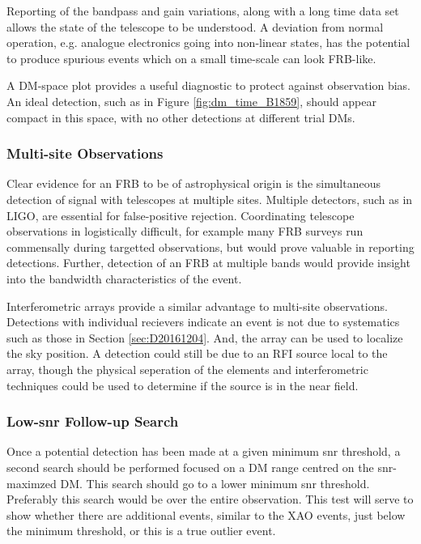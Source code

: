 \documentclass[a4paper,fleqn,usenatbib]{mnras}
\begin{document}
Reporting of the bandpass and gain variations, along with a long time data set
allows the state of the telescope to be understood. A deviation from normal
operation, e.g. analogue electronics going into non-linear states, has the
potential to produce spurious events which on a small time-scale can look
FRB-like.

A DM-space plot provides a useful diagnostic to protect against observation
bias. An ideal detection, such as in Figure \ref{fig:dm_time_B1859}, should
appear compact in this space, with no other detections at different trial DMs.

\subsubsection{Multi-site Observations}

Clear evidence for an FRB to be of astrophysical origin is the simultaneous
detection of signal with telescopes at multiple sites. Multiple detectors, such
as in LIGO, are essential for false-positive rejection. Coordinating telescope
observations in logistically difficult, for example many FRB surveys run
commensally during targetted observations, but would prove valuable in reporting
detections.  Further, detection of an FRB at multiple bands would provide
insight into the bandwidth characteristics of the event.

Interferometric arrays provide a similar advantage to multi-site observations.
Detections with individual recievers indicate an event is not due to systematics
such as those in Section \ref{sec:D20161204}. And, the array can be used to
localize the sky position. A detection could still be due to an RFI source local to
the array, though the physical seperation of the elements and interferometric
techniques could be used to determine if the source is in the near field.

\subsubsection{Low-\gls{snr} Follow-up Search}

Once a potential detection has been made at a given minimum \gls{snr} threshold,
a second search should be performed focused on a DM range centred on the
\gls{snr}-maximzed DM. This search should go to a lower minimum \gls{snr} threshold.
Preferably this search would be over the entire observation. This test will
serve to show whether there are additional events, similar to the XAO events,
just below the minimum threshold, or this is a true outlier event.
\end{document}
